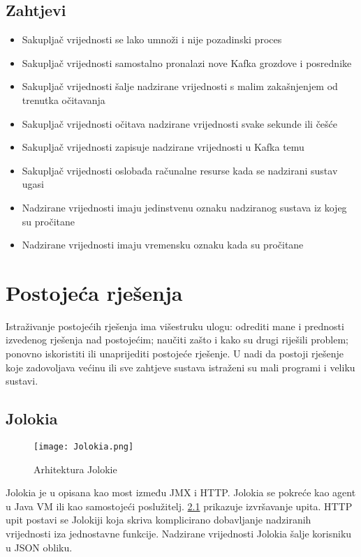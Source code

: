 \documentclass[times, utf8, diplomski, numeric]{fer}
\begin{document}
\section{Zahtjevi}

\begin{itemize}
    \item Sakupljač vrijednosti se lako umnoži i nije pozadinski proces
    \item Sakupljač vrijednosti samostalno pronalazi nove Kafka grozdove i posrednike
    \item Sakupljač vrijednosti šalje nadzirane vrijednosti s malim zakašnjenjem od trenutka očitavanja
    \item Sakupljač vrijednosti očitava nadzirane vrijednosti svake sekunde ili češće
    \item Sakupljač vrijednosti zapisuje nadzirane vrijednosti u Kafka temu
    \item Sakupljač vrijednosti oslobađa računalne resurse kada se nadzirani sustav ugasi
    \item Nadzirane vrijednosti imaju jedinstvenu oznaku nadziranog sustava iz kojeg su pročitane
    \item Nadzirane vrijednosti imaju vremensku oznaku kada su pročitane
\end{itemize}

\chapter{Postojeća rješenja}

Istraživanje postojećih rješenja ima višestruku ulogu: odrediti mane i prednosti izvedenog rješenja nad postojećim; naučiti zašto i kako su drugi riješili problem; ponovno iskoristiti ili unaprijediti postojeće rješenje. U nadi da postoji rješenje koje zadovoljava većinu ili sve zahtjeve sustava istraženi su mali programi i veliku sustavi.

\section{Jolokia}

\begin{figure}[H]
    \centering
    \texttt{[image: Jolokia.png]}
    \caption{Arhitektura Jolokie}
    \label{fig:jolokia}
\end{figure}

Jolokia je u \citep{jolokia} opisana kao most između JMX i HTTP. Jolokia se pokreće kao agent u Java VM ili kao samostojeći poslužitelj. \ref{fig:jolokia} prikazuje izvršavanje upita. HTTP upit postavi se Jolokiji koja skriva komplicirano dobavljanje nadziranih vrijednosti iza jednostavne funkcije. Nadzirane vrijednosti Jolokia šalje korisniku u JSON obliku.
\end{document}
